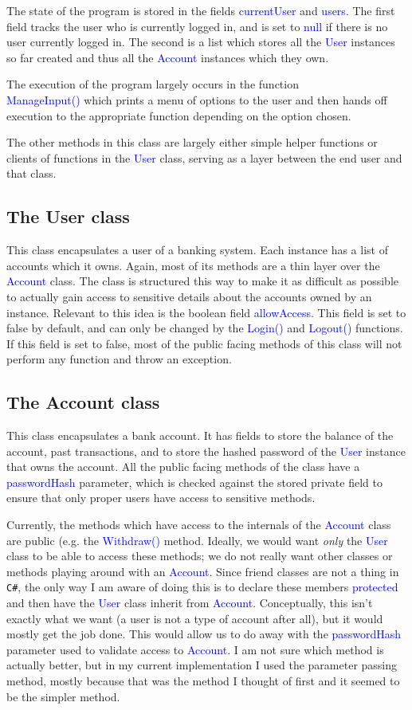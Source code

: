 \documentclass[12pt, notitlepage] {amsart}
\newcommand{\aq}[1] {\textcolor{blue}{#1}}
\begin{document}
The state of the program is stored in the fields \aq{currentUser} and \aq{users}. The first field tracks the user who is currently logged in, and is set to \aq{null} if there is no user currently logged in. The second is a list which stores all the \aq{User} instances so far created and thus all the \aq{Account} instances which they own.

The execution of the program largely occurs in the function \\ \aq{ManageInput()} which prints a menu of options to the user and then hands off execution to the appropriate function depending on the option chosen.

The other methods in this class are largely either simple helper functions or clients of functions in the \aq{User} class, serving as a layer between the end user and that class.

\subsection{The User class} This class encapsulates a user of a banking system. Each instance has a list of accounts which it owns. Again, most of its methods are a thin layer over the \aq{Account} class. The class is structured this way to make it as difficult as possible to actually gain access to sensitive details about the accounts owned by an instance. Relevant to this idea is the boolean field \aq{allowAccess}. This field is set to false by default, and can only be changed by the \aq{Login()} and \aq{Logout()} functions. If this field is set to false, most of the public facing methods of this class will not perform any function and throw an exception.

\subsection{The Account class} This class encapsulates a bank account. It has fields to store the balance of the account, past transactions, and to store the hashed password of the \aq{User} instance that owns the account. All the public facing methods of the class have a \aq{passwordHash} parameter, which is checked against the stored private field to ensure that only proper users have access to sensitive methods.

Currently, the methods which have access to the internals of the \aq{Account} class are public (e.g. the \aq{Withdraw()} method. Ideally, we would want \textit{only} the \aq{User} class to be able to access these methods; we do not really want other classes or methods playing around with an \aq{Account}. Since friend classes are not a thing in \texttt{C\#}, the only way I am aware of doing this is to declare these members \aq{protected} and then have the \aq{User} class inherit from \aq{Account}. Conceptually, this isn't exactly what we want (a user is not a type of account after all), but it would mostly get the job done. This would allow us to do away with the \aq{passwordHash} parameter used to validate access to \aq{Account}. I am not sure which method is actually better, but in my current implementation I used the parameter passing method, mostly because that was the method I thought of first and it seemed to be the simpler method.
\end{document}
